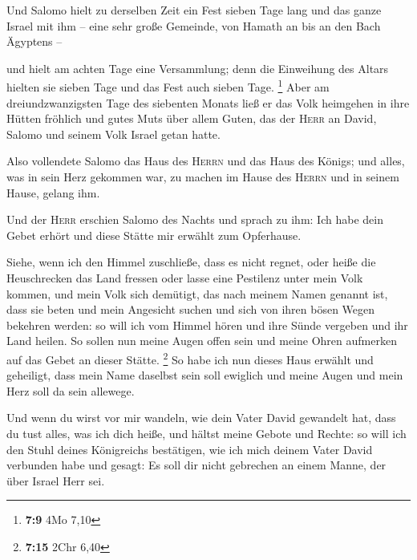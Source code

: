  Und Salomo hielt zu derselben Zeit ein Fest sieben Tage
lang und das ganze Israel mit ihm -- eine sehr große Gemeinde, von
Hamath an bis an den Bach Ägyptens --

 und hielt am achten Tage eine Versammlung; denn die
Einweihung des Altars hielten sie sieben Tage und das Fest auch sieben
Tage. \footnote{\textbf{7:9} 4Mo 7,10}  Aber am
dreiundzwanzigsten Tage des siebenten Monats ließ er das Volk heimgehen
in ihre Hütten fröhlich und gutes Muts über allem Guten, das der
\textsc{Herr} an David, Salomo und seinem Volk Israel getan hatte.

 Also vollendete Salomo das Haus des \textsc{Herrn} und
das Haus des Königs; und alles, was in sein Herz gekommen war, zu machen
im Hause des \textsc{Herrn} und in seinem Hause, gelang ihm.

 Und der \textsc{Herr} erschien Salomo des Nachts und
sprach zu ihm: Ich habe dein Gebet erhört und diese Stätte mir erwählt
zum Opferhause.

 Siehe, wenn ich den Himmel zuschließe, dass es nicht
regnet, oder heiße die Heuschrecken das Land fressen oder lasse eine
Pestilenz unter mein Volk kommen,  und mein Volk sich
demütigt, das nach meinem Namen genannt ist, dass sie beten und mein
Angesicht suchen und sich von ihren bösen Wegen bekehren werden: so will
ich vom Himmel hören und ihre Sünde vergeben und ihr Land heilen.
 So sollen nun meine Augen offen sein und meine Ohren
aufmerken auf das Gebet an dieser Stätte. \footnote{\textbf{7:15} 2Chr
  6,40}  So habe ich nun dieses Haus erwählt und
geheiligt, dass mein Name daselbst sein soll ewiglich und meine Augen
und mein Herz soll da sein allewege.

 Und wenn du wirst vor mir wandeln, wie dein Vater David
gewandelt hat, dass du tust alles, was ich dich heiße, und hältst meine
Gebote und Rechte:  so will ich den Stuhl deines
Königreichs bestätigen, wie ich mich deinem Vater David verbunden habe
und gesagt: Es soll dir nicht gebrechen an einem Manne, der über Israel
Herr sei.

